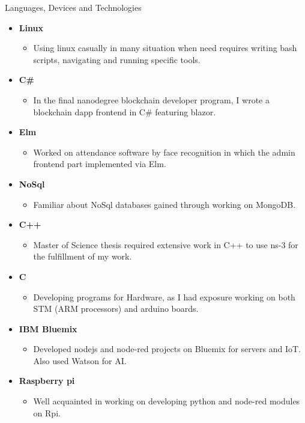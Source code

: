 \documentclass[]{mcdowellcv}
\begin{document}
\begin{cvsection}{Languages, Devices and Technologies}
\begin{cvsubsection}{}{}{}
\begin{itemize}
                                  \item \textbf{Linux}
				\begin{itemize}
					\item Using linux casually in many situation when need requires writing bash scripts, navigating and running specific tools. 
				\end{itemize}
				\item \textbf{C\#}
				\begin{itemize}
					\item In the final nanodegree blockchain developer program, I wrote a blockchain dapp frontend in C\# featuring blazor.
				\end{itemize}
				\item \textbf{Elm}
				\begin{itemize}
					\item Worked on attendance software by face recognition in which the admin frontend part implemented via Elm.
				\end{itemize}
				\item \textbf{NoSql}
				\begin{itemize}
					\item Familiar about NoSql databases gained through working on MongoDB.
				\end{itemize}
				\item \textbf{C++}
				\begin{itemize}
					\item Master of Science thesis required extensive work in C++ to use ns-3 for the fulfillment of my work.
				\end{itemize}
				\item \textbf{C}
				\begin{itemize}
					\item Developing programs for Hardware, as I had exposure working on both STM (ARM processors) and arduino boards.
                \end{itemize}
				\item \textbf{IBM Bluemix}
				\begin{itemize}
					\item Developed nodejs and node-red projects on Bluemix for servers and IoT. Also used Watson for AI.
                                     \end{itemize}
                                     \item \textbf{Raspberry pi}
				\begin{itemize}
					\item Well acquainted in working on developing python and node-red modules on Rpi.
				\end{itemize}
				

\end{itemize}
\end{cvsubsection}
\end{cvsection}
\end{document}
